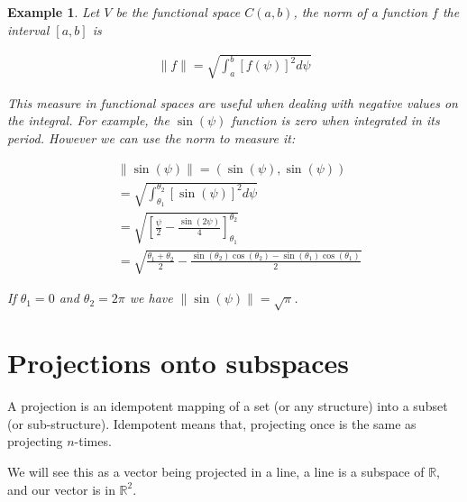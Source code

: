 \documentclass{book}
\newtheorem{example}{Example}[chapter]
\begin{document}
\begin{example}
    Let $V$ be the functional space $C(a,b)$, the norm of a function $f$ the interval $\left[a,b\right]$ is

    \begin{equation*}
        \begin{split}
            \|f\| = \sqrt{\int_{a}^{b}{\left[f(\psi)\right]^{2}d\psi}}
        \end{split}
    \end{equation*}

    This measure in functional spaces are useful when dealing with negative values
    on the integral. For example, the $\sin (\psi)$ function is zero when
    integrated in its period. However we can use the norm to measure it:

    \begin{equation*}
        \begin{split}
             & \|\sin(\psi)\| = \left(\sin(\psi), \sin(\psi)\right)
            \\                      & = \sqrt{\int_{\theta_1}^{\theta_2}{\left[\sin(\psi)\right]^{2}d\psi}}
            \\                      & = \sqrt{\left[\frac{\psi}{2} - \frac{\sin\left(2\psi\right)}{4}\right]_{\theta_1}^{\theta_2}}
            \\ &= \sqrt{\frac{\theta_1 + \theta_2}{2} - \frac{\sin(\theta_2)\cos(\theta_2)-\sin(\theta_1)\cos(\theta_1)}{2}}
        \end{split}
    \end{equation*}

    If $\theta_1=0$ and $\theta_2=2\pi$ we have $\|\sin(\psi)\|=\sqrt{\pi}$.
\end{example}

\chapter{Projections onto subspaces}

A projection is an idempotent mapping of a set (or any structure) into a subset
(or sub-structure). Idempotent means that, projecting once is the same as
projecting $n$-times.

We will see this as a vector being projected in a line, a line is a subspace of
$\mathbb{R}$, and our vector is in $\mathbb{R}^{2}$.
\end{document}
